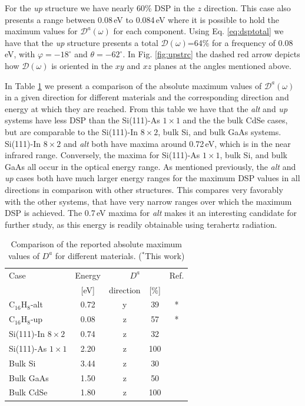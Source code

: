 \documentclass[pss]{wiley2sp} %
\begin{document}
For the \emph{up} structure we have nearly 60\% DSP in the $z$ direction. This
case also presents a range between 0.08\,eV to 0.084\,eV where it is possible
to hold the maximum values for $\mathcal{D}^{a}(\omega)$ for each component.
Using Eq. \eqref{eq:dsptotal} we have that the \emph{up} structure presents a
total $\mathcal{D}(\omega)$=64\% for a frequency of 0.08\,eV, with
$\varphi=-18^{\circ}$ and $\theta=-62^{\circ}$. In Fig. \ref{fig:upstrc} the
dashed red arrow depicts how $\mathcal{D}(\omega)$ is oriented in the $xy$ and
$xz$ planes at the angles mentioned above.

In Table \ref{tab:dacomp} we present a comparison of the absolute maximum
values of $\mathcal{D}^{a}(\omega)$ in a given direction for different
materials and the corresponding direction and energy at which they are
reached. From this table we have that the \emph{alt} and \emph{up} systems
have less DSP than the Si(111)-As $1\times1$ and the the bulk CdSe cases, but
are comparable to the Si(111)-In $8\times2$, bulk Si, and bulk GaAs systems.
Si(111)-In $8\times2$ and \emph{alt} both have maxima around 0.72\,eV, which
is in the near infrared range. Conversely, the maxima for Si(111)-As
$1\times1$, bulk Si, and bulk GaAs all occur in the optical energy range. As
mentioned previously, the \emph{alt} and \emph{up} cases both have much larger
energy ranges for the maximum DSP values in all directions in comparison with
other structures. This compares very favorably with the other systems, that
have very narrow ranges over which the maximum DSP is achieved. The 0.7\,eV
maxima for \emph{alt} makes it an interesting candidate for further study, as
this energy is readily obtainable using terahertz radiation.

\begin{table}[b]
\sidecaption
\begin{tabular}{lcccc}
\hline
\hline
Case & Energy &  \multicolumn{2}{c}{$D^{a}$} &  Ref.\\
\cline{3-4}   & [eV]   & direction & [\%] \\
\hline
C$_{16}$H$_{8}$-alt  & 0.72 & y & 39  & * \\
C$_{16}$H$_{8}$-up   & 0.08 & z & 57  & * \\
Si(111)-In $8\times2$& 0.74 & z & 32  & \cite{arzatePRB14}\\
Si(111)-As $1\times1$& 2.20 & z & 100 & \cite{mendozaPRB12}\\
Bulk Si              & 3.44 & z & 30  & \cite{nastosPRB07}\\
Bulk GaAs            & 1.50 & z & 50  & \cite{nastosPRB07,bhatPRB05}\\
Bulk CdSe            & 1.80 & z & 100 & \cite{nastosPRB07}\\
\hline
\hline
\end{tabular}
\caption[]{Comparison of the reported absolute maximum values of {$D^{a}$} for
different materials. ($^{*}$This work)}
\label{tab:dacomp}
\end{table}
\end{document}

